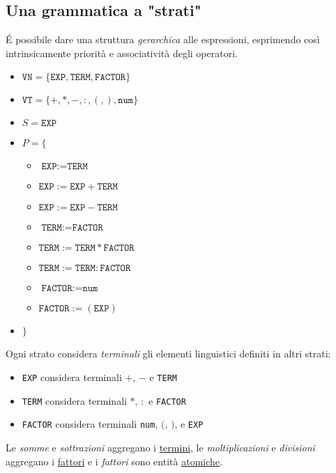 \subsection{Una grammatica a "strati"}
É possibile dare una struttura \textit{gerarchica} alle espressioni, esprimendo così intrinsicamente priorità e associatività degli operatori.

\begin{itemize}
    \item $\texttt{VN} = \{ \texttt{EXP}, \texttt{TERM}, \texttt{FACTOR}\}$
    \item $\texttt{VT} = \{+, *, -, :, (, ), \texttt{num}\}$
    \item $S = \texttt{EXP}$
    \item $P = \{$
    \begin{itemize}
        \item $\texttt{EXP} := \texttt{TERM}$
        \item $\texttt{EXP} := \texttt{EXP} + \texttt{TERM}$
        \item $\texttt{EXP} := \texttt{EXP} - \texttt{TERM}$
        \item $\texttt{TERM} := \texttt{FACTOR}$
        \item $\texttt{TERM} := \texttt{TERM} * \texttt{FACTOR}$
        \item $\texttt{TERM} := \texttt{TERM} : \texttt{FACTOR}$
        \item $\texttt{FACTOR} := \texttt{num}$
        \item $\texttt{FACTOR} := ( \texttt{EXP})$
    \end{itemize}
    \item $\}$
\end{itemize}

Ogni strato considera \textit{terminali} gli elementi linguistici definiti in altri strati:
\begin{itemize}
    \item \texttt{EXP} considera terminali $+$, $-$ e \texttt{TERM}
    \item \texttt{TERM} considera terminali $*$, $:$ e \texttt{FACTOR}
    \item \texttt{FACTOR} considera terminali \texttt{num}, $($, $)$, e \texttt{EXP}
\end{itemize}

Le \textit{somme} e \textit{sottrazioni} aggregano i \underline{termini}, le \textit{moltiplicazioni} e \textit{divisioni} aggregano i \underline{fattori} e i \textit{fattori} sono entità \underline{atomiche}.


